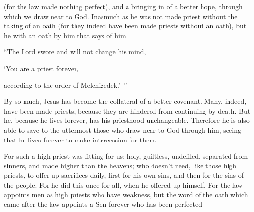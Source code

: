 {(for the law made nothing perfect), and a bringing in of a better hope, through which we draw near to God.
Inasmuch as he was not made priest without the taking of an oath
(for they indeed have been made priests without an oath), but he with an oath by him that says of him,
\par }{\Q “The Lord swore and will not change his mind,
\par }{\QB ‘You are a priest forever,
\par }{\QB according to the order of Melchizedek.’ ”
\par }{\PP {}By so much, Jesus has become the collateral of a better covenant.
Many, indeed, have been made priests, because they are hindered from continuing by death.
But he, because he lives forever, has his priesthood unchangeable.
Therefore he is also able to save to the uttermost those who draw near to God through him, seeing that he lives forever to make intercession for them.
\par }{\PP {}For such a high priest was fitting for us: holy, guiltless, undefiled, separated from sinners, and made higher than the heavens;
who doesn’t need, like those high priests, to offer up sacrifices daily, first for his own sins, and then for the sins of the people. For he did this once for all, when he offered up himself.
For the law appoints men as high priests who have weakness, but the word of the oath which came after the law appoints a Son forever who has been perfected.

}
